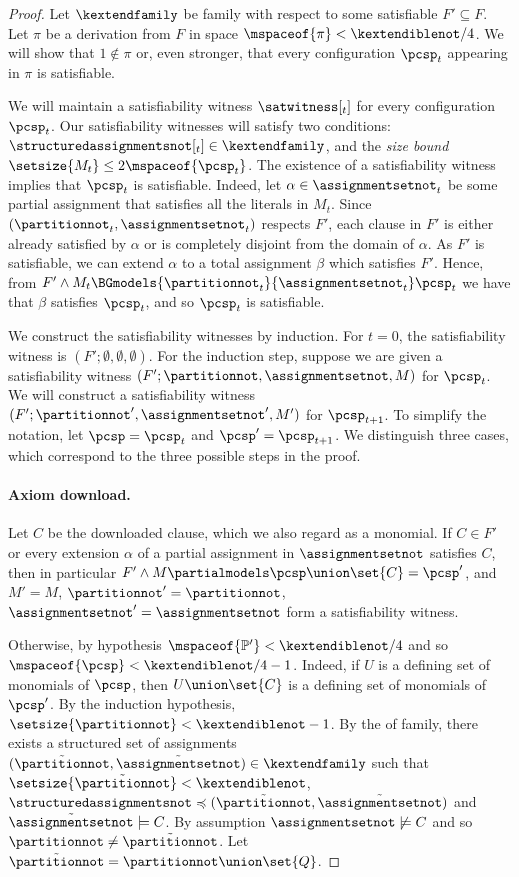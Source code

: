 \begin{proof}
  Let $\kextendfamily$ be \akextendible family with respect to some satisfiable $F'\subseteq F$. Let $\pi$ be a derivation from $F$ in space $\mspaceof{\pi}< \kextendiblenot/4$. We will show that $1 \notin\pi$ or, even stronger, that every configuration $\pcsp_t$ appearing in $\pi$ is satisfiable.

  We will maintain a satisfiability witness $\satwitness[_t]$ for every configuration $\pcsp_t$. Our satisfiability witnesses will satisfy two conditions: $\structuredassignmentsnot[_t] \in \kextendfamily$, and the \emph{size bound} $\setsize{M_t} \leq 2\mspaceof{\pcsp_t}$. The existence of a satisfiability witness implies that $\pcsp_t$ is satisfiable. Indeed, let $\alpha \in \assignmentsetnot_t$ be some partial assignment that satisfies all the literals in $M_t$. Since $(\partitionnot_t,\assignmentsetnot_t)$ respects $F'$, each clause in $F'$ is either already satisfied by $\alpha$ or is completely disjoint from the domain of $\alpha$. As $F'$ is satisfiable, we can extend $\alpha$ to a total assignment $\beta$ which satisfies $F'$. Hence, from $F' \land M_t \BGmodels{\partitionnot_t}{\assignmentsetnot_t} \pcsp_t$ we have that $\beta$ satisfies $\pcsp_t$, and so $\pcsp_t$ is satisfiable.

  We construct the satisfiability witnesses by induction. For $t = 0$, the satisfiability witness is $(F';\emptyset,\emptyset,\emptyset)$. For the induction step, suppose we are given a satisfiability witness $(F';\partitionnot,\assignmentsetnot,M)$ for $\pcsp_t$. We will construct a satisfiability witness $(F';\partitionnot',\assignmentsetnot',M')$ for $\pcsp_{t+1}$. To simplify the notation, let $\pcsp=\pcsp_t$ and $\pcsp'=\pcsp_{t+1}$. We distinguish three cases, which correspond to the three possible steps in the proof.

%
%
%
\paragraph{Axiom download.} Let $C$ be the downloaded clause, which we also regard as a monomial. If $C\in F'$ or every extension $\alpha$ of a partial assignment in $\assignmentsetnot$ satisfies $C$, then in particular $F'\land M \partialmodels \pcsp\union\set{C}=\pcsp'$, and $M'=M$, $\partitionnot'=\partitionnot$, $\assignmentsetnot'=\assignmentsetnot$ form a satisfiability witness.

Otherwise, by hypothesis $\mspaceof{\mathbb{P'}}< \kextendiblenot/4$ and so $\mspaceof{\pcsp}<\kextendiblenot/4-1$. Indeed, if $U$ is a %
defining set of monomials
of $\pcsp$, then $U\union\set{C}$ is a %
defining set of monomials
of $\pcsp'$. By the induction hypothesis, $\setsize{\partitionnot}<\kextendiblenot-1$. By the \extensionproperty of \kextendibleNok family, there exists a structured set of assignments $(\tilde{\partitionnot},\tilde{\assignmentsetnot})\in\kextendfamily$ such that $\setsize{\tilde{\partitionnot}}< \kextendiblenot$, $\structuredassignmentsnot\preccurlyeq(\tilde{\partitionnot},\tilde{\assignmentsetnot})$ and $\tilde{\assignmentsetnot}\models C$. By assumption $\assignmentsetnot\not\models C$ and so $\partitionnot\neq\tilde{\partitionnot}$. Let $\tilde{\partitionnot} = \partitionnot \union \set{Q}$.


\end{proof}
